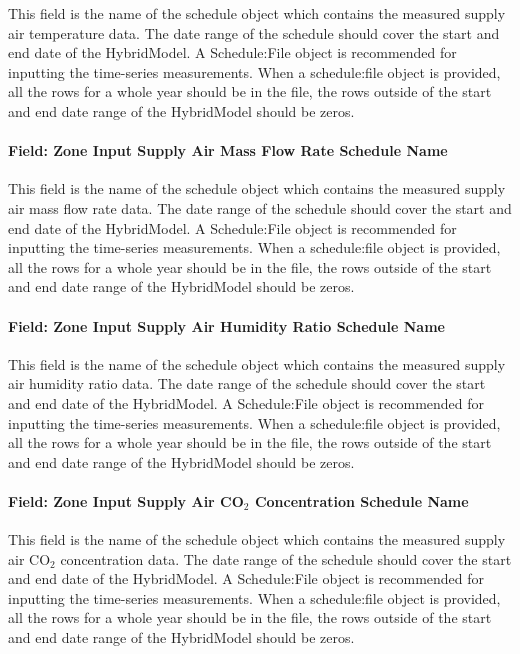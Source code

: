 This field is the name of the schedule object which contains the measured supply air temperature data. The date range of the schedule should cover the start and end date of the HybridModel. A Schedule:File object is recommended for inputting the time-series measurements. When a schedule:file object is provided, all the rows for a whole year should be in the file, the rows outside of the start and end date range of the HybridModel should be zeros.

\paragraph{Field: Zone Input Supply Air Mass Flow Rate Schedule Name}\label{field-zone-input-supply-air-mass-flow-rate-schedule-name-hm}

This field is the name of the schedule object which contains the measured supply air mass flow rate data. The date range of the schedule should cover the start and end date of the HybridModel. A Schedule:File object is recommended for inputting the time-series measurements. When a schedule:file object is provided, all the rows for a whole year should be in the file, the rows outside of the start and end date range of the HybridModel should be zeros.

\paragraph{Field: Zone Input Supply Air Humidity Ratio Schedule Name}\label{field-zone-input-supply-air-humidity-ratio-schedule-name-hm}

This field is the name of the schedule object which contains the measured supply air humidity ratio data. The date range of the schedule should cover the start and end date of the HybridModel. A Schedule:File object is recommended for inputting the time-series measurements. When a schedule:file object is provided, all the rows for a whole year should be in the file, the rows outside of the start and end date range of the HybridModel should be zeros.

\paragraph{Field: Zone Input Supply Air CO$_2$ Concentration Schedule Name}\label{field-zone-input-supply-air-co2-concentration-schedule-name-hm}

This field is the name of the schedule object which contains the measured supply air CO$_2$ concentration data. The date range of the schedule should cover the start and end date of the HybridModel. A Schedule:File object is recommended for inputting the time-series measurements. When a schedule:file object is provided, all the rows for a whole year should be in the file, the rows outside of the start and end date range of the HybridModel should be zeros.


